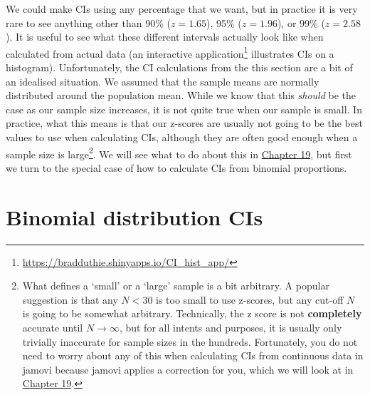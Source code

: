 \documentclass[
  openany]{scrbook}
\begin{document}
We could make CIs using any percentage that we want, but in practice it is very rare to see anything other than 90\% (\(z = 1.65\)), 95\% (\(z = 1.96\)), or 99\% (\(z = 2.58\)).
It is useful to see what these different intervals actually look like when calculated from actual data (an interactive application\footnote{\url{https://bradduthie.shinyapps.io/CI_hist_app/}} illustrates CIs on a histogram).
Unfortunately, the CI calculations from the this section are a bit of an idealised situation.
We assumed that the sample means are normally distributed around the population mean.
While we know that this \emph{should} be the case as our sample size increases, it is not quite true when our sample is small.
In practice, what this means is that our z-scores are usually not going to be the best values to use when calculating CIs, although they are often good enough when a sample size is large\footnote{What defines a `small' or a `large' sample is a bit arbitrary. A popular suggestion \citep[e.g.,][ page 145]{Sokal1995} is that any \(N < 30\) is too small to use z-scores, but any cut-off \(N\) is going to be somewhat arbitrary. Technically, the z score is not \textbf{completely} accurate until \(N \to \infty\), but for all intents and purposes, it is usually only trivially inaccurate for sample sizes in the hundreds. Fortunately, you do not need to worry about any of this when calculating CIs from continuous data in jamovi because jamovi applies a correction for you, which we will look at in \protect\hyperlink{Chapter_19}{Chapter 19}.}.
We will see what to do about this in \protect\hyperlink{Chapter_19}{Chapter 19}, but first we turn to the special case of how to calculate CIs from binomial proportions.

\hypertarget{binomial-distribution-cis}{%
\section{Binomial distribution CIs}\label{binomial-distribution-cis}}
\end{document}

